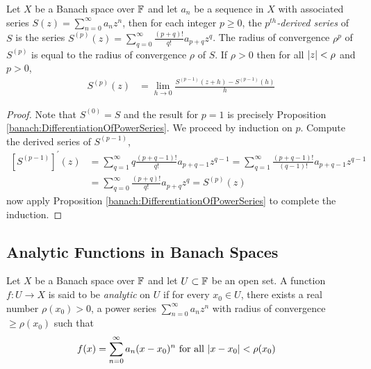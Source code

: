 \begin{cor}\label{banach:MultipleDifferentiationOfPowerSeries} Let $X$ be a
  Banach space over $\mathbb{F}$ and let $a_n$ be a sequence in $X$ with
  associated series $S(z) = \sum_{n=0}^\infty a_n z^n$, then for each integer $p \geq 0$, the
  \emph{$p^{th}$-derived series} of $S$ is the series $S^{(p)}(z) =
  \sum_{q=0}^\infty  \frac{(p+q)!}{q!} a_{p+q} z^{q}$.   The radius of convergence
  $\rho^p$ of
  $S^{(p)}$ is equal to the radius of convergence $\rho$ of $S$.   If
  $\rho > 0$ then for all $\left \vert z \right \vert < \rho$ and $p > 0$,
  \begin{align*}
    S^{(p)}(z) &= \lim_{h \to 0} \frac{S^{(p-1)}(z+h) - S^{(p-1)}(h)}{h}
  \end{align*}
\end{cor}
\begin{proof}
  Note that $S^{(0)} = S$ and the result for $p=1$ is precisely Proposition \ref{banach:DifferentiationOfPowerSeries}.  We proceed by induction on $p$.   Compute the derived series of
  $S^{(p-1)}$, 
  \begin{align*}
    \left[S^{(p-1)}\right]^\prime(z) &= \sum_{q=1}^\infty q \frac{(p+q-1)!}{q!} a_{p+q-1} z^{q-1} = \sum_{q=1}^\infty \frac{(p+q-1)!}{(q-1)!} a_{p+q-1} z^{q-1} \\
    &= \sum_{q=0}^\infty \frac{(p+q)!}{q!} a_{p+q} z^{q} = S^{(p)}(z)
  \end{align*}
  now apply Proposition \ref{banach:DifferentiationOfPowerSeries} to complete the induction.
\end{proof}

\subsection{Analytic Functions in Banach Spaces}

\begin{defn}Let $X$ be a Banach space over $\mathbb{F}$ and let $U \subset \mathbb{F}$ be an open set.   A function $f : U \to X$ is said to be
  \emph{analytic} on $U$ if for every $x_0 \in U$, there exists a real number $\rho(x_0) > 0$, a power series $\sum_{n=0}^\infty a_n z^n$ with radius of
  convergence $\geq \rho(x_0)$ such that
  \begin{align*}
    f(x) &= \sum_{n=0}^\infty a_n (x - x_0)^n \text{ for all $\left \vert x - x_0 \right \vert < \rho(x_0)$}
  \end{align*}
\end{defn}


